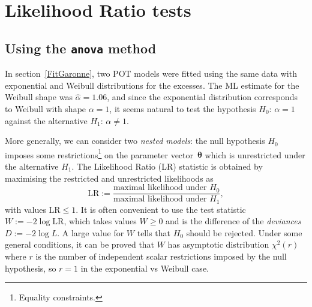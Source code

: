\documentclass[a4paper]{report}
\newcommand{\bs}{\boldsymbol}
\begin{document}


\section{Likelihood Ratio tests}

\subsection{Using the \texttt{anova} method}
In section~\ref{FitGaronne}, two POT models were fitted using the same
\verb@Garonne@ data with exponential and Weibull distributions for the
excesses. The ML estimate for the Weibull shape was $\widehat{\alpha} =
1.06$, and since the
exponential distribution corresponds to Weibull with shape $\alpha =
1$, it seems natural to test the hypothesis $H_0:\,\alpha=1$ against
the alternative $H_1:\,\alpha \neq 1$.

More generally, we can consider
two \textit{nested models}: the null hypothesis $H_0$ imposes some
restrictions\footnote{Equality constraints.}  on the parameter
vector~$\bs{\theta}$ which is unrestricted under the alternative
$H_1$. The Likelihood Ratio (LR) statistic is obtained by maximising
the restricted and unrestricted likelihoods as 
%
$$
\textrm{LR} :=
\frac{\textrm{maximal likelihood under }H_0}{\textrm{maximal
    likelihood under }H_1},
$$
with values $\textrm{LR} \leqslant 1$. It is often convenient to use
the test statistic $W := - 2 \log \textrm{LR}$, which takes values
$W\geqslant 0$ and is the difference of the \textit{deviances} $D :=
-2 \log L$.   A large value for $W$ tells that
$H_0$ should be rejected.  Under some general conditions, it
can be proved that $W$ has asymptotic distribution $\chi^2(r)$ where
$r$ is the number of independent scalar restrictions imposed by the
null hypothesis, so $r=1$ in the exponential vs Weibull case.
\end{document}
